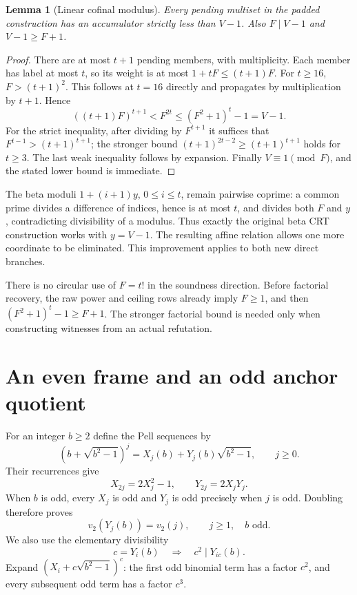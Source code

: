 \documentclass[11pt]{article}
\newtheorem{lemma}[theorem]{Lemma}
\theoremstyle{remark}\newtheorem{remark}[theorem]{Remark}
\begin{document}
\begin{lemma}[Linear cofinal modulus]\label{lem:linear}
Every pending multiset in the padded construction has an accumulator
strictly less than $V-1$. Also $F\mid V-1$ and $V-1\ge F+1$.
\end{lemma}
\begin{proof}
There are at most $t+1$ pending members, with multiplicity. Each member
has label at most $t$, so its weight is at most $1+tF\le(t+1)F$.
For $t\ge16$, $F>(t+1)^2$. This follows at $t=16$ directly and propagates
by multiplication by $t+1$. Hence
\[
 ((t+1)F)^{t+1}<F^{2t}\le(F^2+1)^t-1=V-1.
\]
For the strict inequality, after dividing by $F^{t+1}$ it suffices that
$F^{t-1}>(t+1)^{t+1}$; the stronger bound
$(t+1)^{2t-2}\ge(t+1)^{t+1}$ holds for $t\ge3$.
The last weak inequality follows by expansion. Finally $V\equiv1\pmod F$,
and the stated lower bound is immediate.
\end{proof}

The beta moduli $1+(i+1)y$, $0\le i\le t$, remain pairwise coprime:
a common prime divides a difference of indices, hence is at most $t$,
and divides both $F$ and $y$, contradicting divisibility of a modulus.
Thus exactly the original beta CRT construction works with $y=V-1$.
The resulting affine relation allows one more coordinate to be eliminated.
This improvement applies to both new direct branches.

There is no circular use of $F=t!$ in the soundness direction. Before
factorial recovery, the raw power and ceiling rows already imply $F\ge1$,
and then $(F^2+1)^t-1\ge F+1$. The stronger factorial bound is needed only
when constructing witnesses from an actual refutation.

\section{An even frame and an odd anchor quotient}\label{sec:parity}

For an integer $b\ge2$ define the Pell sequences by
\[
 (b+\sqrt{b^2-1})^j=X_j(b)+Y_j(b)\sqrt{b^2-1},\qquad j\ge0.
\]
Their recurrences give
\[
 X_{2j}=2X_j^2-1,\qquad Y_{2j}=2X_jY_j.
\]
When $b$ is odd, every $X_j$ is odd and $Y_j$ is odd precisely when
$j$ is odd. Doubling therefore proves
\begin{equation}\label{eq:valuation}
 v_2(Y_j(b))=v_2(j),\qquad j\ge1,\quad b\text{ odd}.
\end{equation}
We also use the elementary divisibility
\begin{equation}\label{eq:divisibility}
 c=Y_i(b)\quad\Longrightarrow\quad c^2\mid Y_{ic}(b).
\end{equation}
Expand $(X_i+c\sqrt{b^2-1})^c$: the first odd binomial term has a factor
$c^2$, and every subsequent odd term has a factor $c^3$.
\end{document}
